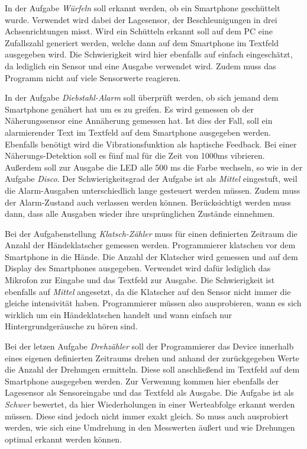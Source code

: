 \documentclass[11pt,a4paper]{report}
\begin{document}
In der Aufgabe \textit{Würfeln} soll erkannt werden, ob ein Smartphone geschüttelt wurde.
Verwendet wird dabei der Lagesensor, der Beschleunigungen in drei Achsenrichtungen misst.
Wird ein Schütteln erkannt soll auf dem PC eine Zufallszahl generiert werden, welche dann auf dem Smartphone im Textfeld ausgegeben wird.
Die Schwierigkeit wird hier ebenfalls auf einfach eingeschätzt, da lediglich ein Sensor und eine Ausgabe verwendet wird.
Zudem muss das Programm nicht auf viele Sensorwerte reagieren.

In der Aufgabe \textit{Diebstahl-Alarm} soll überprüft werden, ob sich jemand dem Smartphone genähert hat um es zu greifen.
Es wird gemessen ob der Näherungssensor eine Annäherung gemessen hat.
Ist dies der Fall, soll ein alarmierender Text im Textfeld auf dem Smartphone ausgegeben werden.
Ebenfalls benötigt wird die Vibrationsfunktion als haptische Feedback.
Bei einer Näherungs-Detektion soll es fünf mal für die Zeit von 1000ms vibrieren.
Außerdem soll zur Ausgabe die LED alle 500 ms die Farbe wechseln, so wie in der Aufgabe \textit{Disco}.
Der Schwierigkeitsgrad der Aufgabe ist als \textit{Mittel} eingestuft, weil die Alarm-Ausgaben unterschiedlich lange gesteuert werden müssen.
Zudem muss der Alarm-Zustand auch verlassen werden können.
Berücksichtigt werden muss dann, dass alle Ausgaben wieder ihre ursprünglichen Zustände einnehmen.

Bei der Aufgabenstellung \textit{Klatsch-Zähler} muss für einen definierten Zeitraum die Anzahl der Händeklatscher gemessen werden.
Programmierer klatschen vor dem Smartphone in die Hände.
Die Anzahl der Klatscher wird gemessen und auf dem Display des Smartphones ausgegeben.
Verwendet wird dafür lediglich das Mikrofon zur Eingabe und das Textfeld zur Ausgabe.
Die Schwierigkeit ist ebenfalls auf \textit{Mittel} angesetzt, da die Klatscher auf den Sensor nicht immer die gleiche intensivität haben.
Programmierer müssen also ausprobieren, wann es sich wirklich um ein Händeklatschen handelt und wann einfach nur Hintergrundgeräusche zu hören sind.

Bei der letzen Aufgabe \textit{Drehzähler} soll der Programmierer das Device innerhalb eines eigenen definierten Zeitraums drehen und anhand der zurückgegeben Werte die Anzahl der Drehungen ermitteln.
Diese soll anschließend im Textfeld auf dem Smartphone ausgegeben werden.
Zur Verwenung kommen hier ebenfalls der Lagesensor als Sensoreingabe und das Textfeld als Ausgabe.
Die Aufgabe ist als \textit{Schwer} bewertet, da hier Wiederholungen in einer Werteabfolge erkannt werden müssen.
Diese sind jedoch nicht immer exakt gleich.
So muss auch ausprobiert werden, wie sich eine Umdrehung in den Messwerten äußert und wie Drehungen optimal erkannt werden können.
\end{document}
